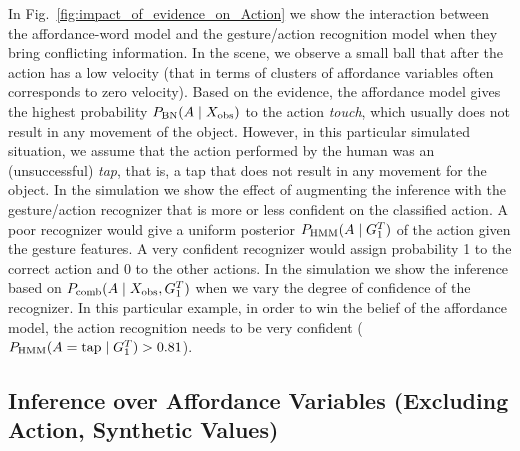 In Fig.~\ref{fig:impact_of_evidence_on_Action} we show the interaction between the affordance-word model and the gesture/action recognition model when they bring conflicting information.
In the scene, we observe a small ball that after the action has a low velocity (that in terms of clusters of affordance variables often corresponds to zero velocity).
Based on the evidence, the affordance model gives the highest probability $P_{\text{BN}}(A\mid X_\text{obs})$ to the action \emph{touch}, which usually does not result in any movement of the object.
However, in this particular simulated situation, we assume that the action performed by the human was an (unsuccessful) \emph{tap}, that is, a tap that does not result in any movement for the object.
In the simulation we show the effect of augmenting the inference with the gesture/action recognizer that is more or less confident on the classified action.
A poor recognizer would give a uniform posterior $P_{\text{HMM}}(A\mid G_1^T)$ of the action given the gesture features.
A very confident recognizer would assign probability 1 to the correct action and 0 to the other actions.
In the simulation we show the inference based on $P_\text{comb}(A\mid X_\text{obs},G_1^T)$ when we vary the degree of confidence of the recognizer.
In this particular example, in order to win the belief of the affordance model, the action recognition needs to be very confident ($P_{\text{HMM}}(A=\text{tap}\mid G_1^T) > 0.81$).

\subsection{Inference over Affordance Variables (Excluding Action, Synthetic Values)}

